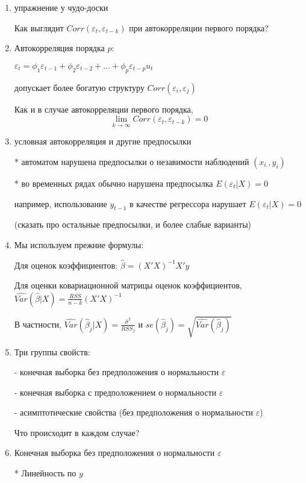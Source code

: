 \documentclass[12pt,a4paper]{article}
\begin{document}
{\begin{enumerate}
\item упражнение у чудо-доски

Как выглядит $Corr(\varepsilon_{t}, \varepsilon_{t-k})$ при автокорреляции первого порядка?

\newpage
\item Автокорреляция порядка $p$:

$\varepsilon_{t}=\phi_1 \varepsilon_{t-1}+\phi_2 \varepsilon_{t-2} +\ldots + \phi_p \varepsilon_{t-p}u_t$

допускает более богатую структуру $Corr(\varepsilon_i, \varepsilon_j)$

Как и в случае автокорреляции первого порядка, 
\[
\lim_{k\to\infty} Corr(\varepsilon_t, \varepsilon_{t-k})=0
\]

\item условная автокорреляция и другие предпосылки

* автоматом нарушена предпосылки о незавимости наблюдений $(x_{i.}, y_i)$  

* во временных рядах обычно нарушена предпосылка $E(\varepsilon_t | X)=0$

например, использование $y_{t-1}$ в качестве регрессора нарушает $E(\varepsilon_t | X)=0$

(сказать про остальные предпосылки, и более слабые варианты)

\newpage
\item  Мы используем прежние формулы:

Для оценок коэффициентов:
$\hat{\beta}=(X'X)^{-1}X'y$

Для оценки ковариационной матрицы оценок коэффициентов,
$\widehat{Var}(\hat{\beta}|X)=\frac{RSS}{n-k}(X'X)^{-1}$

В частности, $\widehat{Var}(\hat{\beta}_j|X)=\frac{\hat{\sigma}^2}{RSS_j}$
и $se(\hat{\beta}_j)=\sqrt{\widehat{Var}(\hat{\beta}_j)}$


\item Три группы свойств:

- конечная выборка без предположения о нормальности $\varepsilon$

- конечная выборка с предположением о нормальности $\varepsilon$

- асимптотические свойства (без предположения о нормальности  $\varepsilon$)

Что происходит в каждом случае?
\newpage
\item Конечная выборка без предположения о нормальности $\varepsilon$

* Линейность по $y$


\end{enumerate}}
\end{document}

